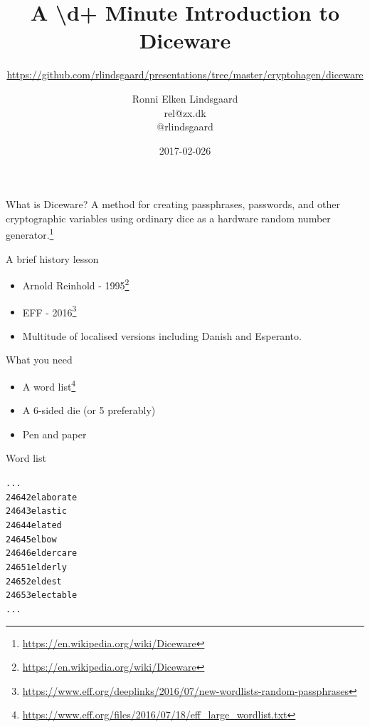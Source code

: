 \documentclass{beamer}
\title{A \textbackslash d+ Minute Introduction to Diceware}
\subtitle{\url{https://github.com/rlindsgaard/presentations/tree/master/cryptohagen/diceware}}
\author{Ronni Elken Lindsgaard \\ rel@zx.dk \\ @rlindsgaard}
\date{2017-02-026}
\begin{document}
\begin{frame}
  \maketitle
\end{frame}

\begin{frame}{What is Diceware?}
A method for creating passphrases, passwords, and other cryptographic variables using ordinary dice as a hardware random number generator.\footnote{\url{https://en.wikipedia.org/wiki/Diceware}}

\end{frame}

\begin{frame}{A brief history lesson}
    \begin{itemize}
        \item Arnold Reinhold - 1995\footnote{\url{https://en.wikipedia.org/wiki/Diceware}}
        \item EFF - 2016\footnote{\url{https://www.eff.org/deeplinks/2016/07/new-wordlists-random-passphrases}}
        \item Multitude of localised versions including Danish and Esperanto.
    \end{itemize}
\end{frame}

\begin{frame}{What you need}
    \begin{itemize}
        \item A word list\footnote{\url{https://www.eff.org/files/2016/07/18/eff_large_wordlist.txt}}
        \item A 6-sided die (or 5 preferably)
        \item Pen and paper
    \end{itemize}
\end{frame}

\begin{frame}{Word list}
\begin{alltt}
...\\
24642   elaborate\\
24643   elastic\\
24644   elated\\
24645   elbow\\
24646   eldercare\\
24651   elderly\\
24652   eldest\\
24653   electable\\
...

\end{alltt}
\end{frame}
\end{document}

